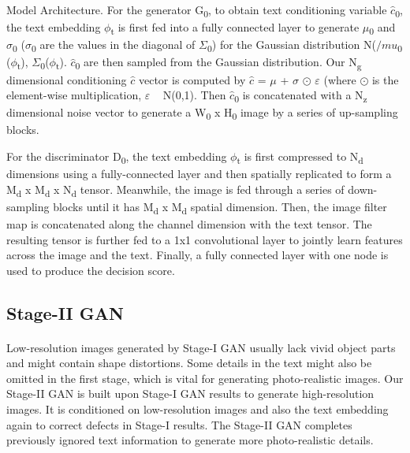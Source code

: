 \documentclass[a4paper,12pt,oneside]{article}
\begin{document}
Model Architecture. For the generator G\textsubscript{0}, to obtain text conditioning variable $\hat{c}$\textsubscript{0}, the text embedding $\phi$\textsubscript{t}  is first fed into a fully connected layer to generate $\mu$\textsubscript{0} and $\sigma$\textsubscript{0} ($\sigma$\textsubscript{0} are the values in the diagonal of $\Sigma$\textsubscript{0}) for the Gaussian distribution N($/mu$\textsubscript{0} ($\phi$\textsubscript{t}), $\Sigma$\textsubscript{0}($\phi$\textsubscript{t}). $\hat{c}$\textsubscript{0} are then sampled from the Gaussian distribution. Our N\textsubscript{g} dimensional conditioning $\hat{c}$ vector  is computed by $\hat{c}$ = $\mu$ + $\sigma$ $\odot$ $\varepsilon$ (where $\odot$ is 
the element-wise multiplication, $\varepsilon$ ~ 
N(0,1). Then $\hat{c}$\textsubscript{0} 
is concatenated with a N\textsubscript{z} 
dimensional noise vector to generate a W\textsubscript{0} x H\textsubscript{0} image by a series of up-sampling blocks.

For the discriminator D\textsubscript{0}, the text embedding $\phi$\textsubscript{t} is first compressed to N\textsubscript{d}  dimensions using a fully-connected layer and then spatially replicated to form a M\textsubscript{d} x M\textsubscript{d} x N\textsubscript{d} tensor. Meanwhile, the image is fed through a series of down-sampling blocks until it has M\textsubscript{d} x M\textsubscript{d} spatial dimension. Then, the image filter map is concatenated along the channel dimension with the text tensor. The resulting tensor is further fed to a 1x1 convolutional layer to jointly learn features across the image and the text. Finally, a fully connected layer with one node is used to produce the decision score. 

\subsection{Stage-II GAN}
\paragraph{}
Low-resolution images generated by Stage-I GAN usually lack vivid object parts and might contain shape distortions. Some details in the text might also be omitted in the first stage, which is vital for generating photo-realistic images. Our Stage-II GAN is built upon Stage-I GAN results to generate high-resolution images. It is conditioned on low-resolution images and also the text embedding again to correct defects in Stage-I results. The Stage-II GAN completes previously ignored text information to generate more photo-realistic details. 
\end{document}
